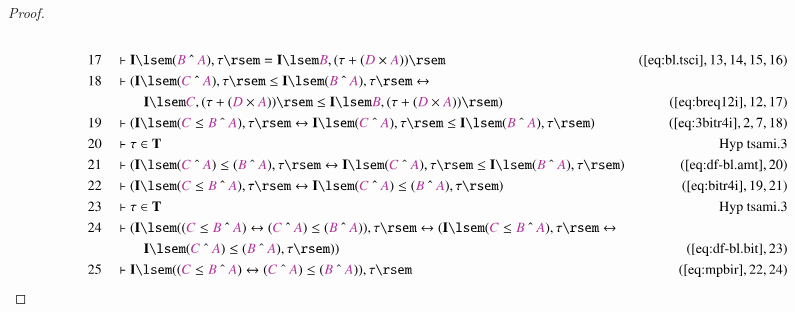 \begin{proof}
\begin{align}
  \\ 17 &&  & \vdash \mathbf{I} \lsem ( \mc{B} ~\string^~ \mc{A} ) , \tau \rsem
      = \mathbf{I} \lsem \mc{B} , ( \tau + ( \mc{D} \times
      \mc{A} ) )
      \rsem&(\mbox{\ref{eq:bl.tsci}},13,14,15,16)\notag
  \\ 18 &&  & \vdash ( \mathbf{I} \lsem ( \mc{C} ~\string^~ \mc{A} ) , \tau
      \rsem \le \mathbf{I} \lsem ( \mc{B} ~\string^~ \mc{A}
      ) , \tau \rsem \leftrightarrow  \notag \\ & & & \qquad
     \mathbf{I} \lsem
      \mc{C} , ( \tau + ( \mc{D} \times \mc{A} ) ) \rsem \le
      \mathbf{I} \lsem \mc{B} , ( \tau + ( \mc{D} \times
      \mc{A} ) ) \rsem
      )&(\mbox{\ref{eq:breq12i}},12,17)\notag
  \\ 19 &&  & \vdash ( \mathbf{I} \lsem ( \mc{C} \le \mc{B} ~\string^~ \mc{A} )
      , \tau \rsem \leftrightarrow \mathbf{I} \lsem (
      \mc{C} ~\string^~ \mc{A} ) , \tau \rsem \le
      \mathbf{I} \lsem ( \mc{B} ~\string^~ \mc{A} ) , \tau
      \rsem )&(\mbox{\ref{eq:3bitr4i}},2,7,18)\notag
  \\ 20 &&  & \vdash \tau \in \mathbf{T}&\text{Hyp~tsami.3}\notag%
  \\ 21 &&  & \vdash ( \mathbf{I} \lsem ( \mc{C} ~\string^~ \mc{A} ) \le (
      \mc{B} ~\string^~ \mc{A} ) , \tau \rsem
      \leftrightarrow \mathbf{I} \lsem ( \mc{C} ~\string^~
      \mc{A} ) , \tau \rsem \le \mathbf{I} \lsem ( \mc{B}
      ~\string^~ \mc{A} ) , \tau \rsem
      )&(\mbox{\ref{eq:df-bl.amt}},20)\notag
  \\ 22 &&  & \vdash ( \mathbf{I} \lsem ( \mc{C} \le \mc{B} ~\string^~ \mc{A} )
      , \tau \rsem \leftrightarrow \mathbf{I} \lsem (
      \mc{C} ~\string^~ \mc{A} ) \le ( \mc{B} ~\string^~
      \mc{A} ) , \tau \rsem
      )&(\mbox{\ref{eq:bitr4i}},19,21)\notag
  \\ 23 &&  & \vdash \tau \in \mathbf{T}&\text{Hyp~tsami.3}\notag%
  \\ 24 &&  & \vdash ( \mathbf{I} \lsem ( ( \mc{C} \le \mc{B} ~\string^~ \mc{A}
      ) \leftrightarrow ( \mc{C} ~\string^~ \mc{A} ) \le (
      \mc{B} ~\string^~ \mc{A} ) ) , \tau \rsem
      \leftrightarrow ( \mathbf{I} \lsem ( \mc{C} \le
      \mc{B} ~\string^~ \mc{A} ) , \tau \rsem
      \leftrightarrow \notag \\ & & & \qquad
     \mathbf{I} \lsem ( \mc{C} ~\string^~
      \mc{A} ) \le ( \mc{B} ~\string^~ \mc{A} ) , \tau
      \rsem ) )&(\mbox{\ref{eq:df-bl.bit}},23)\notag
  \\ 25 &&  & \vdash \mathbf{I} \lsem ( ( \mc{C} \le \mc{B} ~\string^~ \mc{A} )
      \leftrightarrow ( \mc{C} ~\string^~ \mc{A} ) \le (
      \mc{B} ~\string^~ \mc{A} ) ) , \tau
      \rsem&(\mbox{\ref{eq:mpbir}},22,24)\notag
\end{align}
\end{proof}

